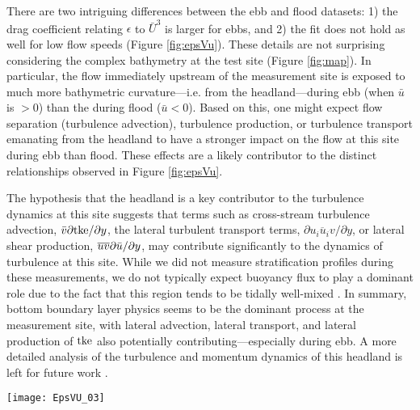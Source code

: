 There are two intriguing differences between the ebb and flood datasets: 1) the drag coefficient relating $\epsilon$ to $\bar{U}^3$ is larger for ebbs, and 2) the fit does not hold as well for low flow speeds (Figure \ref{fig:epsVu}). These details are not surprising considering the complex bathymetry at the test site (Figure \ref{fig:map}). In particular, the flow immediately upstream of the measurement site is exposed to much more bathymetric curvature---i.e. from the headland---during ebb (when $\bar{u}$ is $>0$) than the during flood ($\bar{u}<0$). Based on this, one might expect flow separation (turbulence advection), turbulence production, or turbulence transport emanating from the headland to have a stronger impact on the flow at this site during ebb than flood. These effects are a likely contributor to the distinct relationships observed in Figure \ref{fig:epsVu}. 

The hypothesis that the headland is a key contributor to the turbulence dynamics at this site suggests that terms such as cross-stream turbulence advection, $\bar{v}\partial \mathrm{tke} / \partial y$, the lateral turbulent transport terms, $\partial \overline{u_iu_i v} / \partial y$, or lateral shear production, $\overline{uv}\partial \bar{u} / \partial y$, may contribute significantly to the dynamics of turbulence at this site. While we did not measure stratification profiles during these measurements, we do not typically expect buoyancy flux to play a dominant role due to the fact that this region tends to be tidally well-mixed \cite[]{Geyer+Cannon1982}. In summary, bottom boundary layer physics seems to be the dominant process at the measurement site, with lateral advection, lateral transport, and lateral production of $\mathrm{tke}$ also potentially contributing---especially during ebb. A more detailed analysis of the turbulence and momentum dynamics of this headland is left for future work \cite[e.g., similar to ][]{Warner++2013}.

\begin{figure*}[t]
  \centering
  \texttt{[image: EpsVU\_03]}
  \caption{A log-log plot of $\epsilon$ vs. $\bar{U}$ for the June 2014 TTM (diamonds) and May 2015 SMB (dots) deployments, during ebb (left) and flood (right). Black points are 5-minute averages.  Green dots are mean values within speed bins of 0.2 m s$^{-1}$ width that have at least 10 points (50 minutes of data); their vertical bars are 95\% bootstrap confidence intervals. The blue line shows a $\bar U^3$ slope, wherein the proportionality constant (blue box) is calculated by taking the log-space mean of $\epsilon/\bar U^3$. }
  \label{fig:epsVu}
\end{figure*}



